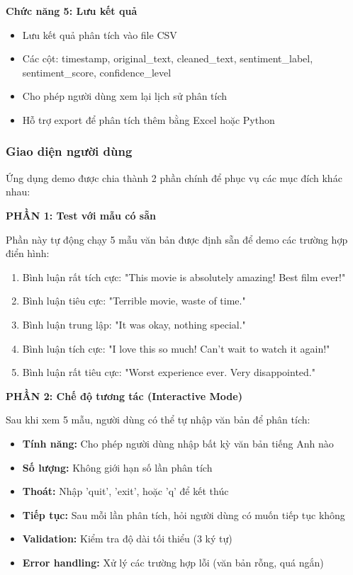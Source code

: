 \textbf{Chức năng 5: Lưu kết quả}
\begin{itemize}
    \item Lưu kết quả phân tích vào file CSV
    \item Các cột: timestamp, original\_text, cleaned\_text, sentiment\_label, sentiment\_score, confidence\_level
    \item Cho phép người dùng xem lại lịch sử phân tích
    \item Hỗ trợ export để phân tích thêm bằng Excel hoặc Python
\end{itemize}

\subsubsection{Giao diện người dùng}

Ứng dụng demo được chia thành 2 phần chính để phục vụ các mục đích khác nhau:

\textbf{PHẦN 1: Test với mẫu có sẵn}

Phần này tự động chạy 5 mẫu văn bản được định sẵn để demo các trường hợp điển hình:

\begin{enumerate}
    \item Bình luận rất tích cực: "This movie is absolutely amazing! Best film ever!"
    \item Bình luận tiêu cực: "Terrible movie, waste of time."
    \item Bình luận trung lập: "It was okay, nothing special."
    \item Bình luận tích cực: "I love this so much! Can't wait to watch it again!"
    \item Bình luận rất tiêu cực: "Worst experience ever. Very disappointed."
\end{enumerate}

\textbf{PHẦN 2: Chế độ tương tác (Interactive Mode)}

Sau khi xem 5 mẫu, người dùng có thể tự nhập văn bản để phân tích:

\begin{itemize}
    \item \textbf{Tính năng:} Cho phép người dùng nhập bất kỳ văn bản tiếng Anh nào
    \item \textbf{Số lượng:} Không giới hạn số lần phân tích
    \item \textbf{Thoát:} Nhập 'quit', 'exit', hoặc 'q' để kết thúc
    \item \textbf{Tiếp tục:} Sau mỗi lần phân tích, hỏi người dùng có muốn tiếp tục không
    \item \textbf{Validation:} Kiểm tra độ dài tối thiểu (3 ký tự)
    \item \textbf{Error handling:} Xử lý các trường hợp lỗi (văn bản rỗng, quá ngắn)
\end{itemize}

